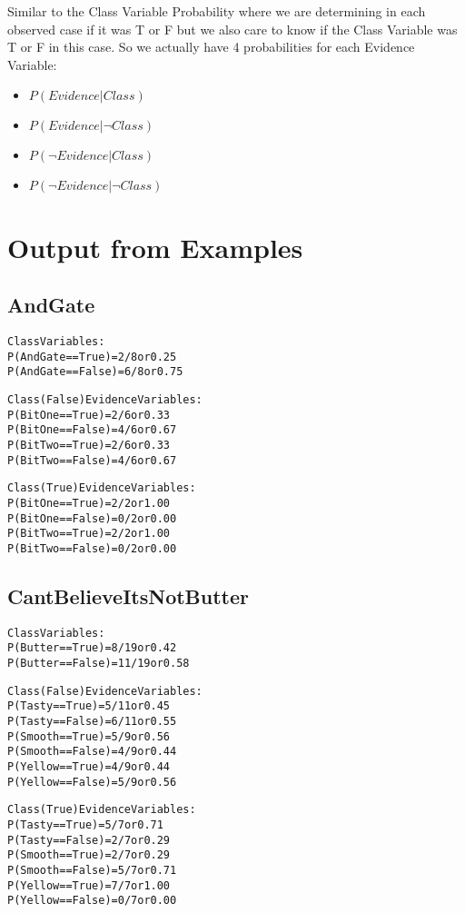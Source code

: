 \documentclass{article}
\begin{document}
    Similar to the Class Variable Probability where we are determining in each observed case if it was T or F but we also
    care to know if the Class Variable was T or F in this case. So we actually have 4 probabilities for each Evidence Variable:

    \begin{itemize}
    \item     $P(Evidence | Class)$
    \item     $P(Evidence | \lnot Class)$
    \item     $P(\lnot Evidence | Class)$
    \item     $P(\lnot Evidence | \lnot Class)$
    \end{itemize}


  \section{Output from Examples}
  \subsection{AndGate}
  \begin{alltt}
Class Variables:
  P(AndGate == True)  = 2/8 or 0.25
  P(AndGate == False)   = 6/8 or 0.75

Class(False) Evidence Variables:
  P(BitOne == True)   = 2/6 or 0.33
  P(BitOne == False)  = 4/6 or 0.67
  P(BitTwo == True)   = 2/6 or 0.33
  P(BitTwo == False)  = 4/6 or 0.67

Class(True) Evidence Variables:
  P(BitOne == True)   = 2/2 or 1.00
  P(BitOne == False)  = 0/2 or 0.00
  P(BitTwo == True)   = 2/2 or 1.00
  P(BitTwo == False)  = 0/2 or 0.00
  \end{alltt}

  \subsection{CantBelieveItsNotButter}
  \begin{alltt}
Class Variables:
  P(Butter == True)   = 8/19 or 0.42
  P(Butter == False)  = 11/19 or 0.58

Class(False) Evidence Variables:
  P(Tasty == True)  = 5/11 or 0.45
  P(Tasty == False)   = 6/11 or 0.55
  P(Smooth == True)   = 5/9 or 0.56
  P(Smooth == False)  = 4/9 or 0.44
  P(Yellow == True)   = 4/9 or 0.44
  P(Yellow == False)  = 5/9 or 0.56

Class(True) Evidence Variables:
  P(Tasty == True)  = 5/7 or 0.71
  P(Tasty == False)   = 2/7 or 0.29
  P(Smooth == True)   = 2/7 or 0.29
  P(Smooth == False)  = 5/7 or 0.71
  P(Yellow == True)   = 7/7 or 1.00
  P(Yellow == False)  = 0/7 or 0.00
  \end{alltt}
\end{document}

